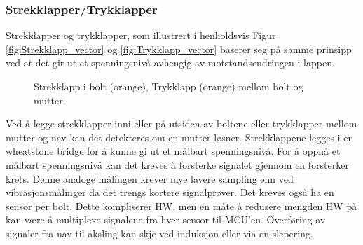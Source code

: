 \subsubsection{Strekklapper/Trykklapper}

Strekklapper og trykklapper, som illustrert i henholdsvis Figur \ref{fig:Strekklapp_vector} og \ref{fig:Trykklapp_vector} baserer seg på samme prinsipp ved at det gir ut et spenningsnivå avhengig av
motstandsendringen i lappen. 
\begin{figure}[H] \centering
{}
\hspace{3cm}
\caption{\protect{\ref{fig:Strekklapp_vector}} Strekklapp i bolt (orange), \protect{\ref{fig:Trykklapp_vector}} Trykklapp (orange) mellom bolt og mutter.}
\end{figure}
Ved å legge strekklapper inni eller på utsiden av boltene eller
trykklapper mellom mutter og nav kan det detekteres om en mutter løsner. Strekklappene
legges i en wheatstone bridge \cite{wheatstone} for å kunne gi ut et målbart
spenningsnivå. For å oppnå et målbart spenningsnivå kan det kreves å
forsterke signalet gjennom en forsterker krets. Denne analoge målingen krever mye lavere sampling enn ved
vibrasjonsmålinger da det trengs kortere signalprøver.
Det kreves også ha en sensor per bolt. Dette kompliserer HW, men en måte å redusere
mengden HW på kan være å multiplexe signalene fra hver sensor til MCU'en. 
Overføring av signaler fra nav til aksling kan skje ved induksjon eller via en slepering. 


